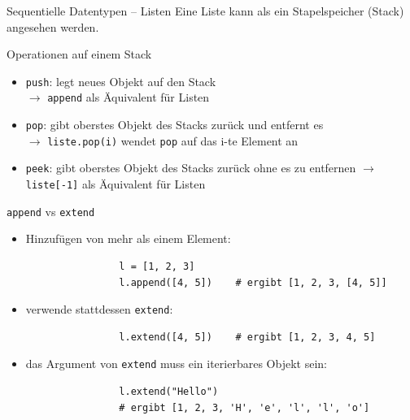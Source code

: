 \documentclass[utf8, smaller, c]{beamer}
\renewcommand{\tt}[1]{{\texttt{#1}}}
\begin{document}
\begin{frame}{Sequentielle Datentypen -- Listen}
	\vspace*{-2mm}
	Eine Liste kann als ein Stapelspeicher (Stack) angesehen werden.
	\begin{block}{Operationen auf einem Stack}
		\begin{itemize}
			\item \verb+push+: legt neues Objekt auf den Stack \\
			$\rightarrow$ \verb+append+ als Äquivalent für Listen
			\item \verb+pop+: gibt oberstes Objekt des Stacks zurück und entfernt es \\
			$\rightarrow$ \verb+liste.pop(i)+ wendet \verb+pop+ auf das i-te Element an
			\item \verb+peek+: gibt oberstes Objekt des Stacks zurück ohne es zu entfernen $\rightarrow$
			\verb+liste[-1]+ als Äquivalent für Listen
		\end{itemize}
	\end{block}

	\framebreak

	\begin{block}{\tt{append} vs \tt{extend}}
		\begin{itemize}
			\item Hinzufügen von mehr als einem Element:
			\begin{verbatim}
				l = [1, 2, 3]
				l.append([4, 5])	# ergibt [1, 2, 3, [4, 5]]
			\end{verbatim}
			\item verwende stattdessen \tt{extend}:
			\begin{verbatim}
				l.extend([4, 5])	# ergibt [1, 2, 3, 4, 5]
			\end{verbatim}				 
			\item das Argument von \tt{extend} muss ein iterierbares Objekt sein:
			\begin{verbatim}
				l.extend("Hello")	
				# ergibt [1, 2, 3, 'H', 'e', 'l', 'l', 'o']
			\end{verbatim}
		\end{itemize}
	\end{block}

	\framebreak


\end{frame}
\end{document}
